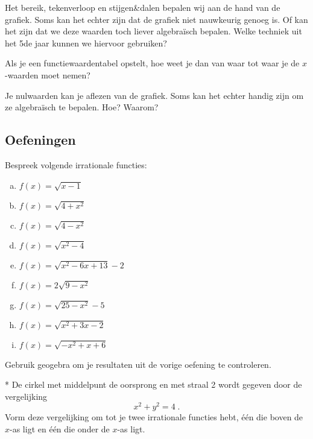 \documentclass[12pt,twoside]{article}
\begin{document}
\begin{oefening}
Het bereik, tekenverloop en stijgen\&dalen bepalen wij aan de hand van de grafiek. Soms kan het echter zijn dat de grafiek niet nauwkeurig genoeg is. Of kan het zijn dat we deze waarden toch liever algebraïsch bepalen. Welke techniek uit het 5de jaar kunnen we hiervoor gebruiken?
\end{oefening}

\begin{oefening}
Als je een functiewaardentabel opstelt, hoe weet je dan van waar tot waar je de $x$-waarden moet nemen?
\end{oefening}

\begin{oefening}
Je nulwaarden kan je aflezen van de grafiek. Soms kan het echter handig zijn om ze algebraïsch te bepalen. Hoe? Waarom?
\end{oefening}

\needspace{4cm}
\subsection{Oefeningen}

\begin{oefening}
Bespreek volgende irrationale functies:
\begin{enumerate}[(a)]
  \item $f(x)=\sqrt{x-1}$
  \item $f(x)=\sqrt{4+x^2}$
  \item $f(x)=\sqrt{4-x^2}$
  \item $f(x)=\sqrt{x^2-4}$
  \item $f(x)=\sqrt{x^2-6x+13}-2$
  \item $f(x)=2\sqrt{9-x^2}$
  \item $f(x)=\sqrt{25-x^2}-5$
  \item $f(x)=\sqrt{x^2+3x-2}$
  \item $f(x)=\sqrt{-x^2+x+6}$
\end{enumerate}
\end{oefening}

\begin{oefening}
Gebruik geogebra om je resultaten uit de vorige oefening te controleren.
\end{oefening}

\begin{oefening}*
De cirkel met middelpunt de oorsprong en met straal 2 wordt gegeven door de vergelijking
$$x^2+y^2=4\;.$$
Vorm deze vergelijking om tot je twee irrationale functies hebt, één die boven de $x$-as ligt en één die onder de $x$-as ligt.
\end{oefening}
\end{document}
